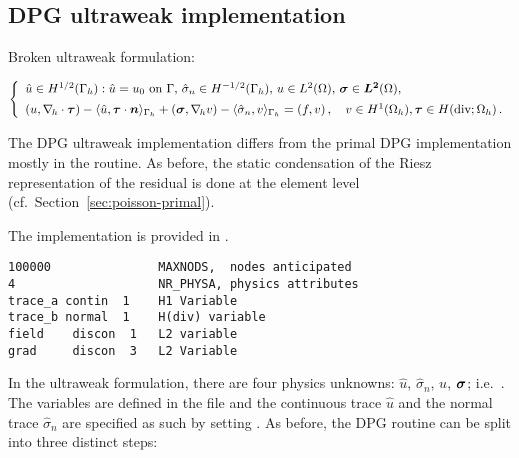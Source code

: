 %
%


\subsection{DPG ultraweak implementation}
\label{sec:poisson-ultraweak}
Broken ultraweak formulation:

\[
\left\{
\begin{array}{llll}
	\hat u \in H^{1/2}(\Gamma_h): \hat u = u_0 \text{ on } \Gamma,\,
	\hat{\sigma}_n \in H^{-1/2}(\Gamma_h),\,
	u \in L^2(\Omega),\,
	\boldsymbol \sigma \in \boldsymbol{L^2}(\Omega) , \\[5pt]
	(u, \nabla_{\hskip -1pt h} \cdot \boldsymbol \tau)
	- \langle \hat u, \boldsymbol \tau \cdot \boldsymbol n \rangle_{\Gamma_h}
	+ (\boldsymbol \sigma, \nabla_{\hskip -1pt h} v)
	- \langle \hat{\sigma}_n , v \rangle_{\Gamma_h}
	= (f,v) \, ,\quad
	v \in H^1(\Omega_h), 
	\boldsymbol \tau \in H(\text{div}; \Omega_h) \, .
\end{array}
\right.
\]

The DPG ultraweak implementation differs from the primal DPG implementation mostly in the  routine. As before, the static condensation of the Riesz representation of the residual is done at the element level (cf.~Section~\ref{sec:poisson-primal}). 

The implementation is provided in .

\begin{lstlisting}[caption=\file{POISSON/ULTRAWEAK\_DPG/input/physics} input file.]
100000               MAXNODS,  nodes anticipated
4                    NR_PHYSA, physics attributes
trace_a contin  1    H1 Variable
trace_b normal  1    H(div) variable
field    discon  1   L2 variable
grad     discon  3   L2 Variable
\end{lstlisting}

In the ultraweak formulation, there are four physics unknowns: $\hat u$, $\hat{\sigma}_n$, $u$, $\boldsymbol \sigma$; i.e.~. The variables are defined in the  file and the continuous trace $\hat u$ and the normal trace $\hat \sigma_n$ are specified as such by setting . As before, the DPG  routine can be split into three distinct steps:

